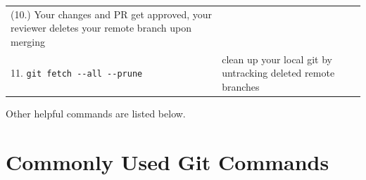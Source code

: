 \documentclass[]{book}
\begin{document}
\begin{longtable}[]{@{}ll@{}}
\begin{minipage}[t]{0.34\columnwidth}
(10.) Your changes and PR get approved, your reviewer deletes your remote branch upon merging\strut
\end{minipage} & \begin{minipage}[t]{0.60\columnwidth}\raggedright
\strut
\end{minipage}\tabularnewline
\begin{minipage}[t]{0.34\columnwidth}\raggedright
11. \texttt{git\ fetch\ -\/-all\ -\/-prune}\strut
\end{minipage} & \begin{minipage}[t]{0.60\columnwidth}\raggedright
clean up your local git by untracking deleted remote branches\strut
\end{minipage}\tabularnewline
\bottomrule
\end{longtable}

Other helpful commands are listed below.

\hypertarget{commonly-used-git-commands}{%
\section{Commonly Used Git Commands}\label{commonly-used-git-commands}}
\end{document}
